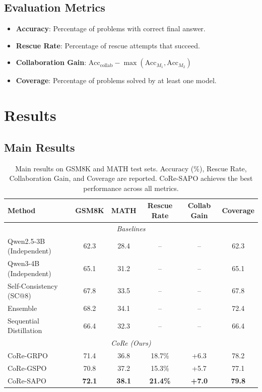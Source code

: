 \documentclass[11pt]{article}
\newcommand{\methodname}{CoRe}
\begin{document}
\subsection{Evaluation Metrics}

\begin{itemize}
    \item \textbf{Accuracy}: Percentage of problems with correct final answer.
    \item \textbf{Rescue Rate}: Percentage of rescue attempts that succeed.
    \item \textbf{Collaboration Gain}: $\text{Acc}_{\text{collab}} - \max(\text{Acc}_{M_1}, \text{Acc}_{M_2})$
    \item \textbf{Coverage}: Percentage of problems solved by at least one model.
\end{itemize}

\section{Results}

\subsection{Main Results}

\begin{table}[t]
    \centering
    \begin{tabular}{lccccc}
        \toprule
        \textbf{Method} & \textbf{GSM8K} & \textbf{MATH} & \textbf{Rescue Rate} & \textbf{Collab Gain} & \textbf{Coverage} \\
        \midrule
        \multicolumn{6}{c}{\textit{Baselines}} \\
        Qwen2.5-3B (Independent) & 62.3 & 28.4 & -- & -- & 62.3 \\
        Qwen3-4B (Independent) & 65.1 & 31.2 & -- & -- & 65.1 \\
        Self-Consistency (SC@8) & 67.8 & 33.5 & -- & -- & 67.8 \\
        Ensemble & 68.2 & 34.1 & -- & -- & 72.4 \\
        Sequential Distillation & 66.4 & 32.3 & -- & -- & 66.4 \\
        \midrule
        \multicolumn{6}{c}{\textit{\methodname{} (Ours)}} \\
        \methodname{}-GRPO & 71.4 & 36.8 & 18.7\% & +6.3 & 78.2 \\
        \methodname{}-GSPO & 70.8 & 37.2 & 15.3\% & +5.7 & 77.1 \\
        \methodname{}-SAPO & \textbf{72.1} & \textbf{38.1} & \textbf{21.4\%} & \textbf{+7.0} & \textbf{79.8} \\
        \bottomrule
    \end{tabular}
    \caption{Main results on GSM8K and MATH test sets. Accuracy (\%), Rescue Rate, Collaboration Gain, and Coverage are reported. \methodname{}-SAPO achieves the best performance across all metrics.}
    \label{tab:main_results}
\end{table}
\end{document}
